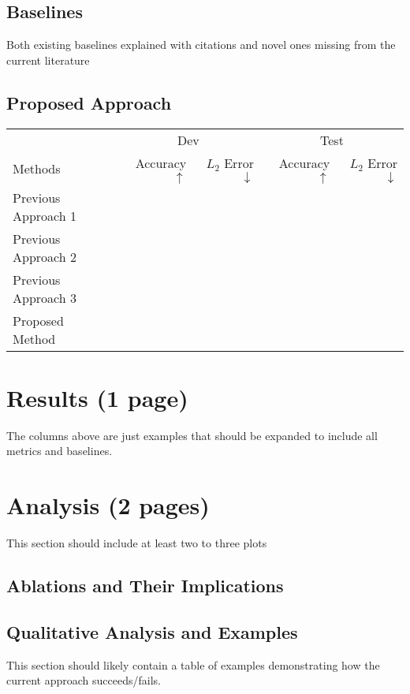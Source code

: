 \documentclass[11pt,a4paper]{article}
\begin{document}
\subsection{Baselines}
Both existing baselines explained with citations and novel ones missing from the current literature

\subsection{Proposed Approach}

\clearpage
\begin{table*}[t]
\centering
\begin{tabular}{lrrrr}
\toprule
                            & \multicolumn{2}{c}{Dev} & \multicolumn{2}{c}{Test}\\
Methods                     & Accuracy $\uparrow$ & $L_2$ Error $\downarrow$ & Accuracy $\uparrow$ & $L_2$ Error $\downarrow$ \\
\midrule
Previous Approach 1 \cite{} & & & & \\
Previous Approach 2 \cite{} & & & & \\
Previous Approach 3 \cite{} & & & & \\
\midrule
Proposed Method             & & & & \\
\bottomrule
\end{tabular}
\end{table*}
\section{Results (1 page)}
The columns above are just examples that should be expanded to include all metrics and baselines.

\clearpage
\section{Analysis (2 pages)}
This section should include at least two to three plots
\subsection{Ablations and Their Implications}

\subsection{Qualitative Analysis and Examples}
This section should likely contain a table of examples demonstrating how the current approach succeeds/fails.




\end{document}

